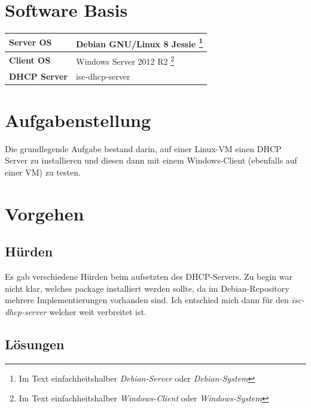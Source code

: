 \documentclass[12pt,a4paper,twoside,titlepage]{article}
\title{\titleText}
\author{\authorText}
\date{\dateText}
\begin{document}
	\maketitle
	\tableofcontents

        \section{Software Basis}

        \begin{tabular}{|l|l|}
          \hline
          \textbf{Server OS} & Debian GNU/Linux 8 Jessie \footnote{Im Text einfachheitshalber \textit{Debian-Server} oder \textit{Debian-System}}\\\hline
          \textbf{Client OS} & Windows Server 2012 R2 \footnote{Im Text einfachheitshalber \textit{Windows-Client} oder \textit{Windows-System}} \\\hline
          \textbf{DHCP Server} & isc-dhcp-server \\\hline
        \end{tabular}

        \section{Aufgabenstellung}

        Die grundlegende Aufgabe bestand darin, auf einer Linux-VM einen DHCP Server zu installieren und diesen dann mit einem Windows-Client (ebenfalls auf einer VM) zu testen.

        \section{Vorgehen}

        \subsection{Hürden}

        Es gab verschiedene Hürden beim aufsetzten des DHCP-Servers. Zu begin war nicht klar, welches package installiert werden sollte, da im Debian-Repository mehrere Implementierungen vorhanden sind. Ich entschied mich dann für den \textit{isc-dhcp-server} welcher weit verbreitet ist.
        
        \subsection{Lösungen}
        
\end{document}
